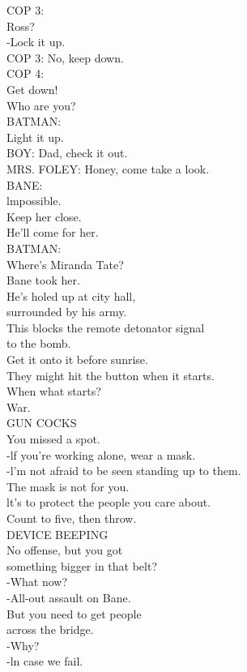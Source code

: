 \documentclass{article}
\begin{document}
\begin{multicols}{3}
COP 3:\\
Ross?\\
-Lock it up.\\
COP 3: No, keep down.\\
COP 4:\\
Get down!\\
Who are you?\\
BATMAN:\\
Light it up.\\
BOY: Dad, check it out.\\
MRS. FOLEY: Honey, come take a look.\\
BANE:\\
lmpossible.\\
Keep her close.\\
He'll come for her.\\
BATMAN:\\
Where's Miranda Tate?\\
Bane took her.\\
He's holed up at city hall,\\
surrounded by his army.\\
This blocks the remote detonator signal\\
to the bomb.\\
Get it onto it before sunrise.\\
They might hit the button when it starts.\\
When what starts?\\
War.\\
GUN COCKS\\
You missed a spot.\\
-lf you're working alone, wear a mask.\\
-l'm not afraid to be seen standing up to them.\\
The mask is not for you.\\
lt's to protect the people you care about.\\
Count to five, then throw.\\
DEVICE BEEPING\\
No offense, but you got\\
something bigger in that belt?\\
-What now?\\
-All-out assault on Bane.\\
But you need to get people\\
across the bridge.\\
-Why?\\
-ln case we fail.\\

\end{multicols}
\end{document}
